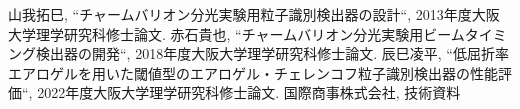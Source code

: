 \begin{thebibliography}{99}

   山我拓巳, ``チャームバリオン分光実験用粒子識別検出器の設計``, 2013年度大阪大学理学研究科修士論文.
   赤石貴也, ``チャームバリオン分光実験用ビームタイミング検出器の開発``, 2018年度大阪大学理学研究科修士論文.
   辰巳凌平, ``低屈折率エアロゲルを用いた閾値型のエアロゲル・チェレンコフ粒子識別検出器の性能評価``, 2022年度大阪大学理学研究科修士論文.
   国際商事株式会社, 技術資料

\end{thebibliography}


